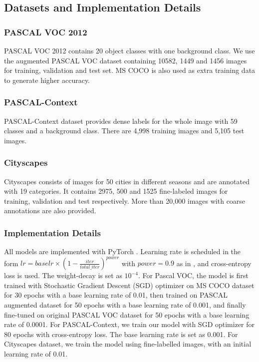 \documentclass[10pt,twocolumn,letterpaper]{article}
\begin{document}
\subsection{Datasets and Implementation Details}

\subsubsection{PASCAL VOC 2012}
PASCAL VOC 2012 \cite{everingham2015pascal} contains 20 object classes with one background class. We use the augmented PASCAL VOC dataset \cite{hariharan2015hypercolumns} containing 10582,  1449 and 1456 images for training, validation and test set. MS COCO \cite{lin2014microsoft} is also used as extra training data to generate higher accuracy. 

\subsubsection{PASCAL-Context}

PASCAL-Context dataset \cite{mottaghi2014role} provides dense labels for the whole image with 59 classes and a background class. There are 4,998 training images and 5,105 test images. 

\subsubsection{Cityscapes}

Cityscapes \cite{cordts2016cityscapes} consists of images for 50 cities in different seasons and are annotated with 19 categories. It contains 2975, 500 and 1525 fine-labeled images for training, validation and test respectively. More than 20,000 images with coarse annotations are also provided.

\subsubsection{Implementation Details}
\label{sec_implementation}
All models are implemented with PyTorch \cite{paszke2017automatic}. Learning rate is scheduled in the form $lr = baselr \times (1-\frac{iter}{total\_iter})^{power}$ with $power=0.9$ as in \cite{zhang2018context}, and cross-entropy loss is used. The weight-decay is set as $10^{-4}$.  For Pascal VOC, the model is first trained with Stochastic Gradient Descent (SGD) optimizer on MS COCO dataset for 30 epochs with a base learning rate of 0.01, then trained on PASCAL augmented dataset for 50 epochs with a base learning rate of 0.001, and finally fine-tuned on original PASCAL VOC dataset for 50 epochs with a base learning rate of 0.0001. For PASCAL-Context, we train our model with SGD optimizer for 80 epochs with cross-entropy loss. The base learning rate is set as 0.001. For Cityscapes dataset, we train the model using fine-labelled images, with an initial learning rate of 0.01. 
\end{document}
